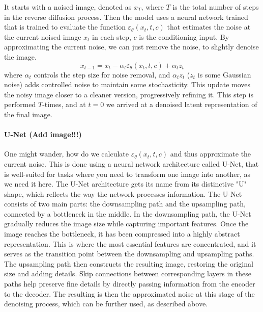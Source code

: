 \documentclass[11pt]{article}
\begin{document}
It starts with a noised image, denoted as $x_T$, where $T$ is the total number of steps in the reverse diffusion process. Then the model uses a neural network trained that is trained to evaluate the function $\varepsilon_\theta(x_t,t,c)$ that estimates the noise at the current noised image $x_t$ in each step, $c$ is the conditioning input. By approximating the current noise, we can just remove the noise, to slightly denoise the image.
$$x_{t-1}=x_t-\alpha_t \varepsilon_\theta(x_t,t,c)+ \alpha_t z_t$$
where $\alpha_t$ controls the step size for noise removal, and $\alpha_t z_t$  ($z_t$ is some Gaussian noise) adds controlled noise to maintain some stochasticity. This update moves the noisy image closer to a cleaner version, progressively refining it. This step is performed $T$-times, and at $t=0$ we arrived at a denoised latent representation of the final image.

\paragraph{U-Net (Add image!!!)}
One might wander, how do we calculate $\varepsilon_\theta(x_t,t,c)$ and thus approximate the current noise. This is done using a neural network architecture called U-Net\cite{ronneberger2015unetconvolutionalnetworksbiomedical}, that is well-suited for tasks where you need to transform one image into another, as we need it here.
The U-Net architecture gets its name from its distinctive "U" shape, which reflects the way the network processes information. The U-Net consists of two main parts: the downsampling path  and the upsampling path, connected by a bottleneck in the middle.
In the downsampling path, the U-Net gradually reduces the image size while capturing important features. Once the image reaches the bottleneck, it has been compressed into a highly abstract representation. This is where the most essential features are concentrated, and it serves as the transition point between the downsampling and upsampling paths. The upsampling path then constructs the resulting image, restoring the original size and adding details. Skip connections between corresponding layers in these paths help preserve fine details by directly passing information from the encoder to the decoder. 
The resulting is then the approximated noise at this stage of the denoising process, which can be further used, as described above.
\end{document}
